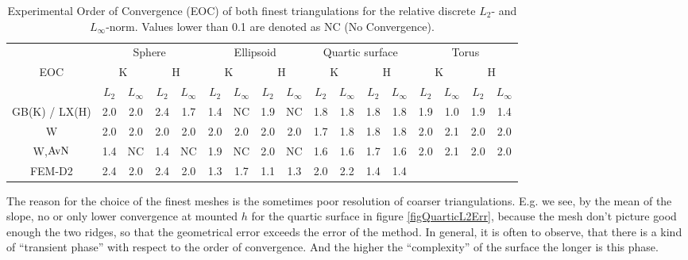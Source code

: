     \begin{table}[tbp]
      \centering
      \begin{tabular}{|*{17}{c|}} \hline
         & \multicolumn{4}{c|}{Sphere} 
         & \multicolumn{4}{c|}{Ellipsoid} 
         & \multicolumn{4}{c|}{Quartic surface} &
        \multicolumn{4}{c|}{Torus} \\\cline{2-17}
          EOC & \multicolumn{2}{c|}{K} & \multicolumn{2}{c|}{H}
              & \multicolumn{2}{c|}{K} & \multicolumn{2}{c|}{H}
              & \multicolumn{2}{c|}{K} & \multicolumn{2}{c|}{H}
              & \multicolumn{2}{c|}{K} & \multicolumn{2}{c|}{H} \\\cline{2-17}
              & \( L_{2} \) & \( L_{\infty} \)
              & \( L_{2} \) & \( L_{\infty} \)
              & \( L_{2} \) & \( L_{\infty} \)
              & \( L_{2} \) & \( L_{\infty} \)
              & \( L_{2} \) & \( L_{\infty} \)
              & \( L_{2} \) & \( L_{\infty} \)
              & \( L_{2} \) & \( L_{\infty} \)
              & \( L_{2} \) & \( L_{\infty} \) \\\hline
        GB(K) / LX(H) & 2.0 & 2.0 & 2.4 & 1.7 & 
                  1.4 & NC  & 1.9 & NC &
                  1.8 & 1.8 & 1.8 & 1.8 &
                  1.9 & 1.0 & 1.9 & 1.4 \\\hline
           W    & 2.0 & 2.0 & 2.0 & 2.0 &
                  2.0 & 2.0 & 2.0 & 2.0 &
                  1.7 & 1.8 & 1.8 & 1.8 &
                  2.0 & 2.1 & 2.0 & 2.0 \\\hline
   W,\( \text{AvN} \) & 1.4 & NC  & 1.4 & NC  &
                  1.9 & NC  & 2.0 & NC  &
                  1.6 & 1.6 & 1.7 & 1.6 &
                  2.0 & 2.1 & 2.0 & 2.0 \\\hline
        FEM-D2  & 2.4 & 2.0 & 2.4 & 2.0 &
                  1.3 & 1.7 & 1.1 & 1.3 & 
                  2.0 & 2.2 & 1.4 & 1.4 &&&&\\\hline
      \end{tabular}
      \caption{Experimental Order of Convergence (EOC) of both finest triangulations for the relative discrete \( L_{2} \)-
      and \( L_{\infty} \)-norm. Values lower than 0.1 are denoted as NC (No Convergence).}
      \label{tabEOC}
    \end{table}
    The reason for the choice of the finest meshes is the sometimes poor resolution of coarser triangulations.
    E.g. we see, by the mean of the slope, no or only lower convergence at mounted \( h \) for the quartic surface in figure
    \ref{figQuarticL2Err},
    because the mesh don't picture good enough the two ridges, so that the geometrical error exceeds the error of the method.
    In general, it is often to observe, that there is a kind of ``transient phase'' with respect to the order of convergence.
    And the higher the ``complexity'' of the surface the longer is this phase.

